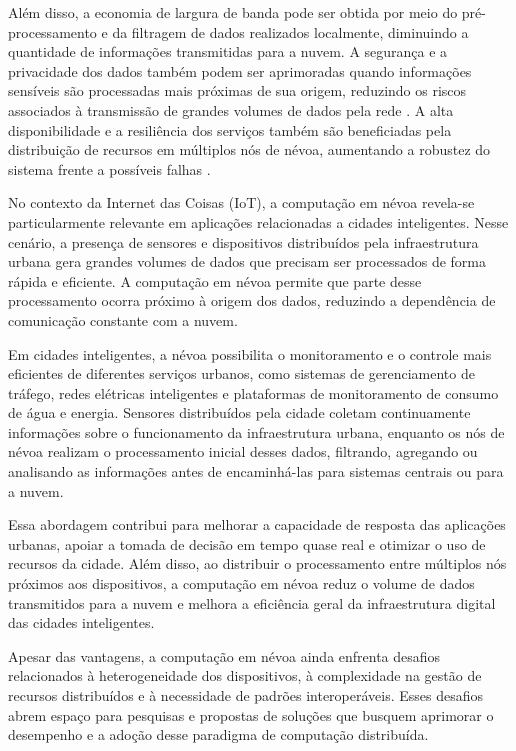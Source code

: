 Além disso, a economia de largura de banda pode ser obtida por meio do pré-processamento e da filtragem de dados realizados localmente, diminuindo a quantidade de informações transmitidas para a nuvem. A segurança e a privacidade dos dados também podem ser aprimoradas quando informações sensíveis são processadas mais próximas de sua origem, reduzindo os riscos associados à transmissão de grandes volumes de dados pela rede \cite{rahmani2018}. A alta disponibilidade e a resiliência dos serviços também são beneficiadas pela distribuição de recursos em múltiplos nós de névoa, aumentando a robustez do sistema frente a possíveis falhas \cite{oliveira2024}.

No contexto da Internet das Coisas (\gls{IoT}), a computação em névoa revela-se particularmente relevante em aplicações relacionadas a cidades inteligentes. Nesse cenário, a presença de sensores e dispositivos distribuídos pela infraestrutura urbana gera grandes volumes de dados que precisam ser processados de forma rápida e eficiente. A computação em névoa permite que parte desse processamento ocorra próximo à origem dos dados, reduzindo a dependência de comunicação constante com a nuvem.

Em cidades inteligentes, a névoa possibilita o monitoramento e o controle mais eficientes de diferentes serviços urbanos, como sistemas de gerenciamento de tráfego, redes elétricas inteligentes e plataformas de monitoramento de consumo de água e energia. Sensores distribuídos pela cidade coletam continuamente informações sobre o funcionamento da infraestrutura urbana, enquanto os nós de névoa realizam o processamento inicial desses dados, filtrando, agregando ou analisando as informações antes de encaminhá-las para sistemas centrais ou para a nuvem.

Essa abordagem contribui para melhorar a capacidade de resposta das aplicações urbanas, apoiar a tomada de decisão em tempo quase real e otimizar o uso de recursos da cidade. Além disso, ao distribuir o processamento entre múltiplos nós próximos aos dispositivos, a computação em névoa reduz o volume de dados transmitidos para a nuvem e melhora a eficiência geral da infraestrutura digital das cidades inteligentes.

Apesar das vantagens, a computação em névoa ainda enfrenta desafios relacionados à heterogeneidade dos dispositivos, à complexidade na gestão de recursos distribuídos e à necessidade de padrões interoperáveis. Esses desafios abrem espaço para pesquisas e propostas de soluções que busquem aprimorar o desempenho e a adoção desse paradigma de computação distribuída.

